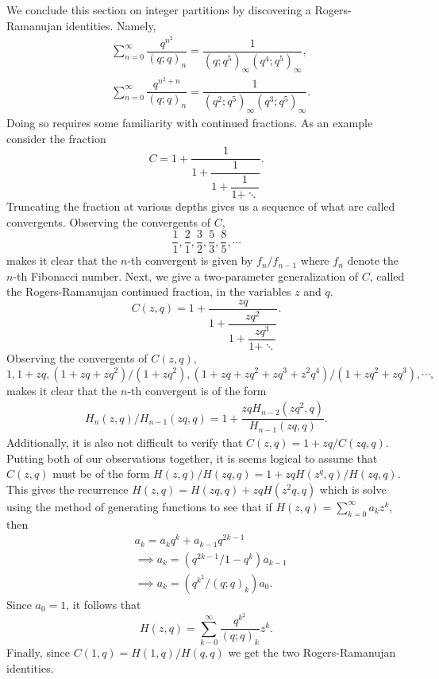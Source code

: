We conclude this section on integer partitions by discovering a Rogers-Ramanujan identities. Namely, 
\begin{align*}
    &\sum_{n=0}^{\infty}\dfrac{q^{n^2}}{(q;q)_n} = \dfrac{1}{(q;q^5)_\infty(q^4;q^5)_\infty}, \\
    &\sum_{n=0}^{\infty}\dfrac{q^{n^2+n}}{(q;q)_n} = \dfrac{1}{(q^2;q^5)_\infty (q^3;q^5)_\infty}.
\end{align*}
Doing so requires some familiarity with continued fractions. As an example consider the fraction
\[
C = 1+\dfrac{1}{1+\dfrac{1}{1+\dfrac{1}{1+\ddots}}}.
\]
Truncating the fraction at various depths gives us a sequence of what are called convergents. Observing the convergents of $C$, \[
\dfrac{1}{1},\dfrac{2}{1},\dfrac{3}{2},\dfrac{5}{3},\dfrac{8}{5},\cdots
\]
makes it clear that the $n$-th convergent is given by $f_n/f_{n-1}$ where $f_n$ denote the $n$-th Fibonacci number. Next, we give a two-parameter generalization of $C$, called the Rogers-Ramanujan continued fraction, in the variables $z$ and $q$.
\[
C(z,q) = 1+\dfrac{zq}{1+\dfrac{zq^2}{1+\dfrac{zq^3}{1+\ddots}}}.
\]
Observing the convergents of $C(z,q)$,
\[
1,1+zq,(1+zq+zq^2)/(1+zq^2),(1+zq+zq^2+zq^3+z^2q^4)/(1+zq^2+zq^3), \cdots,
\]
makes it clear that the $n$-th convergent is of the form 
\begin{align*}
H_n(z,q)/H_{n-1}(zq,q) = 1+\dfrac{zqH_{n-2}(zq^2,q)}{H_{n-1}(zq,q)}.
\end{align*}
Additionally, it is also not difficult to verify that $C(z,q)=1+zq/C(zq,q)$. Putting both of our observations together, it is seems logical to assume that $C(z,q)$ must be of the form $H(z,q)/H(zq,q) = 1+zqH(z^q,q)/H(zq,q)$. This gives the recurrence $H(z,q)=H(zq,q)+zqH(z^2q,q)$ which is solve using the method of generating functions to see that if $H(z,q)=\sum_{k=0}^\infty a_kz^k$, then
\begin{align*}
& a_k = a_kq^k + a_{k-1}q^{2k-1} \\
&\implies a_k = (q^{2k-1}/1-q^k)a_{k-1} \\
&\implies a_k = (q^{k^2}/(q;q)_k)a_0.
\end{align*}
Since $a_0 = 1$, it follows that \[
H(z,q) = \sum_{k-0}^{\infty}\dfrac{q^{k^2}}{(q;q)_k}z^k.
\]
Finally, since $C(1,q)=H(1,q)/H(q,q)$ we get the two Rogers-Ramanujan identities. 
\par
